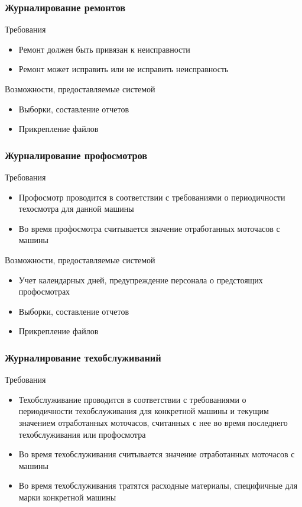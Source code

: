 \documentclass{beamer}
\begin{document}
\begin{frame}
\frametitle{Журналирование ремонтов}
	\begin{block}{Требования}
		\begin{itemize}
		  \item Ремонт должен быть привязан к неисправности
		  \item Ремонт может исправить или не исправить неисправность
	  	\end{itemize}
	\end{block}
	\begin{block}{Возможности, предоставляемые системой}
		\begin{itemize}
		  \item Выборки, составление отчетов
		  \item Прикрепление файлов
	  	\end{itemize}
	\end{block}
\end{frame}

\begin{frame}
\frametitle{Журналирование профосмотров}
	\begin{block}{Требования}
		\begin{itemize}
		  \item Профосмотр проводится в соответствии с требованиями о периодичности
		  техосмотра для данной машины
		  \item Во время профосмотра считывается значение отработанных моточасов с
		  машины
	  	\end{itemize}
	\end{block}
	\begin{block}{Возможности, предоставляемые системой}
		\begin{itemize}
		  \item Учет календарных дней, предупреждение персонала о предстоящих
		  профосмотрах
		  \item Выборки, составление отчетов
		  \item Прикрепление файлов

	  	\end{itemize}
	\end{block}
\end{frame}




\begin{frame}
\frametitle{Журналирование техобслуживаний}
	\begin{block}{Требования}
		\begin{itemize}
		  \item Техобслуживание проводится в соответствии с требованиями о
		  периодичности техобслуживания для конкретной машины и текущим значением
		  отработанных моточасов, считанных с нее во время последнего техобслуживания
		  или профосмотра
		  \item Во время техобслуживания считывается значение отработанных моточасов с
		  машины
		  \item Во время техобслуживания тратятся расходные материалы, специфичные для
		  марки конкретной машины
	  	\end{itemize}
	\end{block}
\end{frame}	
	
\end{document}
